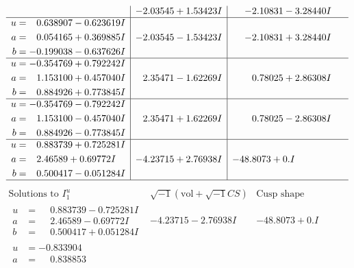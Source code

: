 \documentclass[1p]{elsarticle_modified}
\theoremstyle{definition}
\newcommand{\I}{\sqrt{-1}}
\begin{document}
$$\begin{array}{c|c|c}
 & -2.03545 + 1.53423 I & -2.10831 - 3.28440 I \\ \hline\begin{aligned}
u &= \phantom{-}0.638907 - 0.623619 I \\
a &= \phantom{-}0.054165 + 0.369885 I \\
b &= -0.199038 - 0.637626 I\end{aligned}
 & -2.03545 - 1.53423 I & -2.10831 + 3.28440 I \\ \hline\begin{aligned}
u &= -0.354769 + 0.792242 I \\
a &= \phantom{-}1.153100 + 0.457040 I \\
b &= \phantom{-}0.884926 + 0.773845 I\end{aligned}
 & \phantom{-}2.35471 - 1.62269 I & \phantom{-}0.78025 + 2.86308 I \\ \hline\begin{aligned}
u &= -0.354769 - 0.792242 I \\
a &= \phantom{-}1.153100 - 0.457040 I \\
b &= \phantom{-}0.884926 - 0.773845 I\end{aligned}
 & \phantom{-}2.35471 + 1.62269 I & \phantom{-}0.78025 - 2.86308 I \\ \hline\begin{aligned}
u &= \phantom{-}0.883739 + 0.725281 I \\
a &= \phantom{-}2.46589 + 0.69772 I \\
b &= \phantom{-}0.500417 - 0.051284 I\end{aligned}
 & -4.23715 + 2.76938 I & -48.8073 + 0. I\phantom{ +0.000000I}\\
 \hline 
 \end{array}$$\newpage$$\begin{array}{c|c|c}  
\text{Solutions to }I^u_{1}& \I (\text{vol} + \sqrt{-1}CS) & \text{Cusp shape}\\
 \hline 
\begin{aligned}
u &= \phantom{-}0.883739 - 0.725281 I \\
a &= \phantom{-}2.46589 - 0.69772 I \\
b &= \phantom{-}0.500417 + 0.051284 I\end{aligned}
 & -4.23715 - 2.76938 I & -48.8073 + 0. I\phantom{ +0.000000I} \\ \hline\begin{aligned}
u &= -0.833904\phantom{ +0.000000I} \\
a &= \phantom{-}0.838853\phantom{ +0.000000I} \\

\end{aligned}
\end{array}$$
\end{document}
